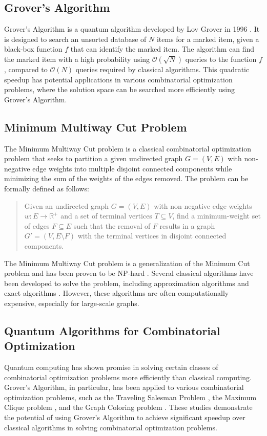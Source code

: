 \subsection{Grover's Algorithm}
Grover's Algorithm is a quantum algorithm developed by Lov Grover in 1996 \cite{grover1996fast}. It is designed to search an unsorted database of $N$ items for a marked item, given a black-box function $f$ that can identify the marked item. The algorithm can find the marked item with a high probability using $\mathcal{O}(\sqrt{N})$ queries to the function $f$, compared to $\mathcal{O}(N)$ queries required by classical algorithms. This quadratic speedup has potential applications in various combinatorial optimization problems, where the solution space can be searched more efficiently using Grover's Algorithm.

\subsection{Minimum Multiway Cut Problem}
The Minimum Multiway Cut problem is a classical combinatorial optimization problem that seeks to partition a given undirected graph $G=(V,E)$ with non-negative edge weights into multiple disjoint connected components while minimizing the sum of the weights of the edges removed. The problem can be formally defined as follows:

\begin{quote}
Given an undirected graph $G=(V,E)$ with non-negative edge weights $w : E \rightarrow \mathbb{R}^+$ and a set of terminal vertices $T \subseteq V$, find a minimum-weight set of edges $F \subseteq E$ such that the removal of $F$ results in a graph $G'=(V,E \setminus F)$ with the terminal vertices in disjoint connected components.
\end{quote}

The Minimum Multiway Cut problem is a generalization of the Minimum Cut problem and has been proven to be NP-hard \cite{dahlhaus1994complexity}. Several classical algorithms have been developed to solve the problem, including approximation algorithms \cite{karger1995randomized, dahlhaus2000approximation} and exact algorithms \cite{goldschmidt1994polyhedra, chopra1993polyhedra}. However, these algorithms are often computationally expensive, especially for large-scale graphs.

\subsection{Quantum Algorithms for Combinatorial Optimization}
Quantum computing has shown promise in solving certain classes of combinatorial optimization problems more efficiently than classical computing. Grover's Algorithm, in particular, has been applied to various combinatorial optimization problems, such as the Traveling Salesman Problem \cite{ambainis2000quantum}, the Maximum Clique problem \cite{cheng2005quantum}, and the Graph Coloring problem \cite{childs2002quantum}. These studies demonstrate the potential of using Grover's Algorithm to achieve significant speedup over classical algorithms in solving combinatorial optimization problems.

